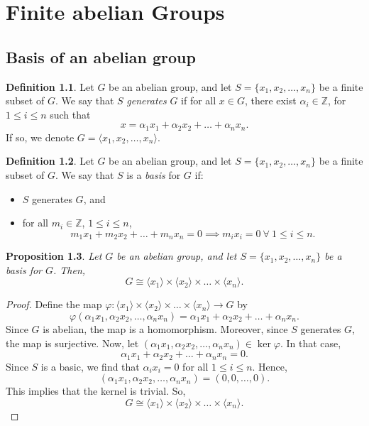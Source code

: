 \documentclass[a4paper, openany]{memoir}
\theoremstyle{definition}
\newtheorem{definition}{Definition}[section]
\theoremstyle{plain}
\newtheorem{proposition}[definition]{Proposition}
\begin{document}
    \chapter{Finite abelian Groups}
    \section{Basis of an abelian group}
    \begin{definition}
        Let $G$ be an abelian group, and let $S = \{x_1, x_2, \dots, x_n\}$ be a finite subset of $G$. We say that $S$ \emph{generates} $G$ if for all $x \in G$, there exist $\alpha_i \in \mathbb{Z}$, for $1 \leq i \leq n$ such that
        \[x = \alpha_1 x_1 + \alpha_2 x_2 + \dots + \alpha_n x_n.\]
        If so, we denote $G = \langle x_1, x_2, \dots, x_n \rangle$.
    \end{definition}

    \begin{definition}
        Let $G$ be an abelian group, and let $S = \{x_1, x_2, \dots, x_n\}$ be a finite subset of $G$. We say that $S$ is a \emph{basis} for $G$ if:
        \begin{itemize}
            \item $S$ generates $G$, and
            \item for all $m_i \in \mathbb{Z}$, $1 \leq i \leq n$,
            \[m_1 x_1 + m_2 x_2 + \dots + m_n x_n = 0 \implies m_i x_i = 0 \ \forall \ 1 \leq i \leq n.\]
        \end{itemize}
    \end{definition}

    \begin{proposition}
        Let $G$ be an abelian group, and let $S = \{x_1, x_2, \dots, x_n\}$ be a basis for $G$. Then,
        \[G \cong \langle x_1 \rangle \times \langle x_2 \rangle \times \dots \times \langle x_n \rangle.\]
    \end{proposition}
    \begin{proof}
        Define the map $\varphi \colon \langle x_1 \rangle \times \langle x_2 \rangle \times \dots \times \langle x_n \rangle \to G$ by
        \[\varphi(\alpha_1 x_1, \alpha_2 x_2, \dots, \alpha_n x_n) = \alpha_1 x_1 + \alpha_2 x_2 + \dots + \alpha_n x_n.\]
        Since $G$ is abelian, the map is a homomorphism. Moreover, since $S$ generates $G$, the map is surjective. Now, let $(\alpha_1 x_1, \alpha_2 x_2, \dots, \alpha_n x_n) \in \ker \varphi$. In that case,
        \[\alpha_1 x_1 + \alpha_2 x_2 + \dots + \alpha_n x_n = 0.\]
        Since $S$ is a basic, we find that $\alpha_i x_i = 0$ for all $1 \leq i \leq n$. Hence, 
        \[(\alpha_1 x_1, \alpha_2 x_2, \dots, \alpha_n x_n) = (0, 0, \dots, 0).\]
        This implies that the kernel is trivial. So, 
        \[G \cong \langle x_1 \rangle \times \langle x_2 \rangle \times \dots \times \langle x_n \rangle.\]
    \end{proof}
\end{document}
